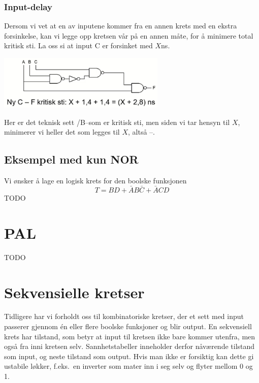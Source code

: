 \documentclass[12pt,a4paper,norsk]{article}
\begin{document}
\subsubsection{Input-delay}
Dersom vi vet at en av inputene kommer fra en annen krets med en ekstra forsinkelse,
kan vi legge opp kretsen vår på en annen måte, for å minimere total kritisk sti. La oss si
at input C er forsinket med $X$\si{\nano\second}.
\begin{center}
  \includegraphics[width=0.6\textwidth,height=\textheight,keepaspectratio]{Krets_CTeknomap}
\end{center}
Her er det teknisk sett \@A/B\@--\@F som er kritisk sti, men siden vi tar hensyn til
$X$, minimerer vi heller det som legges til $X$, altså \@C\@--\@F\@.

\subsection{Eksempel med kun NOR}
Vi ønsker å lage en logisk krets for den boolske funksjonen
\[T = BD + \bar{A}B\bar{C} + \bar{A}CD\]
TODO

\section{PAL}
TODO

\section{Sekvensielle kretser}
Tidligere har vi forholdt oss til kombinatoriske kretser, der et sett med input
passerer gjennom én eller flere boolske funksjoner og blir output. En sekvensiell
krets har tilstand, som betyr at input til kretsen ikke bare kommer utenfra, men
også fra inni kretsen selv. Sannhetstabeller inneholder derfor nåværende tilstand
som input, og neste tilstand som output. Hvis man ikke er forsiktig kan dette gi
ustabile løkker, f.eks.\ en inverter som mater inn i seg selv og flyter mellom 0
og 1.

\begin{center}
\end{center}
\end{document}
